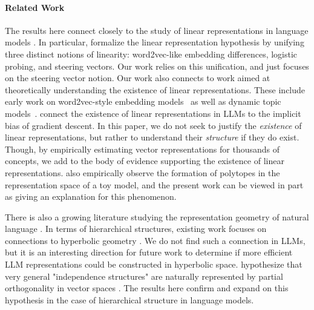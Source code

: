 \documentclass{article}
\begin{document}
\paragraph{Related Work}
The results here connect closely to the study of linear representations in language models
 \citep[e.g.,][]{mikolov2013linguistic,pennington2014glove,arora2016latent, elhage2022toy, burns2022discovering, tigges2023linear, nanda2023emergent, moschella2022relative, li2023inference, gurnee2023finding, wang2023concept, jiang2024origins,park2024linear}.
 In particular, \citet{park2024linear} formalize the linear representation hypothesis by unifying three distinct notions of linearity: word2vec-like embedding differences, logistic probing, and steering vectors. Our work relies on this unification, and just focuses on the steering vector notion. 
Our work also connects to work aimed at theoretically understanding the existence of linear representations. 
These include early work on word2vec-style embedding models~\citep{arora2016latent, Gittens2017SkipGramZ, arora2018linear, ethayarajh2018towards, frandsen2019understanding, allen2019analogies} as well as dynamic topic models~\citep{blei2006dynamic, rudolph2016exponential}.
 connect the existence of linear representations in LLMs to the implicit bias of gradient descent.
In this paper, we do not seek to justify the \emph{existence} of linear representations, but rather to understand their \emph{structure} if they do exist. 
Though, by empirically estimating vector representations for thousands of concepts, we add to the body of evidence supporting the existence of linear representations. \citet{elhage2022toy} also empirically observe the formation of polytopes in the representation space of a toy model, and the present work can be viewed in part as giving an explanation for this phenomenon.

There is also a growing literature studying the representation geometry of natural language \citep{Mimno2017TheSG, reif2019visualizing, volpi2021natural, li2020sentence, chen2021probing, chang2022geometry, liang2022mind, jiang2023uncovering, wang2023concept, park2024linear, valeriani2024geometry}. 
In terms of hierarchical structures, existing work focuses on connections to hyperbolic geometry \citep[][]{nickel2017poincare, ganea2018hyperbolic, chen2021probing, he2024language}.
We do not find such a connection in LLMs, but it is an interesting direction for future work to determine if more efficient LLM representations could be constructed in hyperbolic space.  hypothesize that very general  "independence structures" are naturally represented by partial orthogonality in vector spaces \citep{amini2022non}. The results here confirm and expand on this hypothesis in the case of hierarchical structure in language models.
\end{document}
